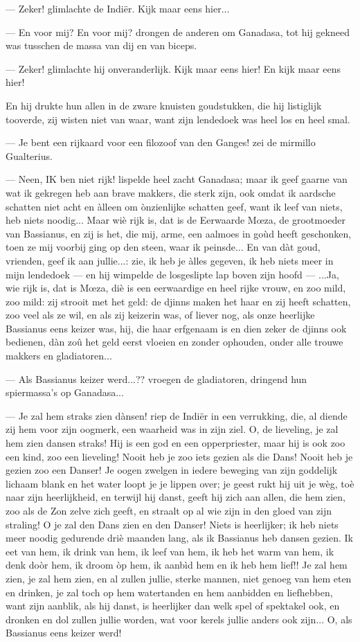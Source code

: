 \documentclass[a4paper, 12pt, oneside, dutch]{article}
\begin{document}
--- Zeker! glimlachte de Indiër. Kijk maar eens hier...

--- En voor mij? En voor mij? drongen de anderen om Ganadasa, tot hij gekneed was tusschen de massa van dij en van biceps.

--- Zeker! glimlachte hij onveranderlijk. Kijk maar eens hier! En kijk maar eens hier!

En hij drukte hun allen in de zware knuisten goudstukken, die hij listiglijk tooverde, zij wisten niet van waar, want zijn lendedoek was heel los en heel smal.

--- Je bent een rijkaard voor een filozoof van den Ganges! zei de mirmillo Gualterius.

--- Neen, IK ben niet rijk! lispelde heel zacht Ganadasa; maar ik geef gaarne van wat ik gekregen heb aan brave makkers, die sterk zijn, ook omdat ik aardsche schatten niet acht en àlleen om ònzienlijke schatten geef, want ik leef van niets, heb niets noodig... Maar wiè rijk is, dat is de Eerwaarde Mœza, de grootmoeder van Bassianus, en zij is het, die mij, arme, een aalmoes in goùd heeft geschonken, toen ze mij voorbij ging op den steen, waar ik peinsde... En van dàt goud, vrienden, geef ik aan jullie...: zie, ik heb je àlles gegeven, ik heb niets meer in mijn lendedoek --- en hij wimpelde de losgeslipte lap boven zijn hoofd --- ...Ja, wie rijk is, dat is Mœza, diè is een eerwaardige en heel rijke vrouw, en zoo mild, zoo mild: zij strooit met het geld: de djinns maken het haar en zij heeft schatten, zoo veel als ze wil, en als zij keizerin was, of liever nog, als onze heerlijke Bassianus eens keizer was, hij, die haar erfgenaam is en dien zeker de djinns ook bedienen, dàn zoû het geld eerst vloeien en zonder ophouden, onder alle trouwe makkers en gladiatoren...

--- Als Bassianus keizer werd...?? vroegen de gladiatoren, dringend hun spiermassa's op Ganadasa...

--- Je zal hem straks zien dànsen! riep de Indiër in een verrukking, die, al diende zij hem voor zijn oogmerk, een waarheid was in zijn ziel. O, de lieveling, je zal hem zien dansen straks! Hij is een god en een opperpriester, maar hij is ook zoo een kind, zoo een lieveling! Nooit heb je zoo iets gezien als die Dans! Nooit heb je gezien zoo een Danser! Je oogen zwelgen in iedere beweging van zijn goddelijk lichaam blank en het water loopt je je lippen over; je geest rukt hij uit je wèg, toè naar zijn heerlijkheid, en terwijl hij danst, geeft hij zich aan allen, die hem zien, zoo als de Zon zelve zich geeft, en straalt op al wie zijn in den gloed van zijn straling! O je zal den Dans zien en den Danser! Niets is heerlijker; ik heb niets meer noodig gedurende driè maanden lang, als ik Bassianus heb dansen gezien. Ik eet van hem, ik drink van hem, ik leef van hem, ik heb het warm van hem, ik denk doòr hem, ik droom òp hem, ik aanbìd hem en ik heb hem lief!! Je zal hem zien, je zal hem zien, en al zullen jullie, sterke mannen, niet genoeg van hem eten en drinken, je zal toch op hem watertanden en hem aanbidden en liefhebben, want zijn aanblik, als hij danst, is heerlijker dan welk spel of spektakel ook, en dronken en dol zullen jullie worden, wat voor kerels jullie anders ook zijn... O, als Bassianus eens keizer werd!
\end{document}
